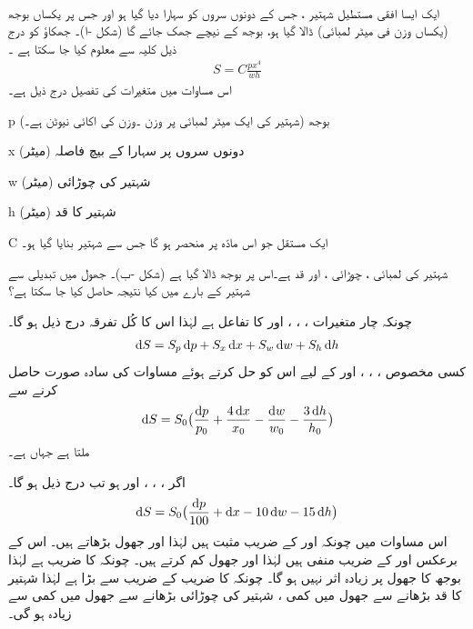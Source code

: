 \\
ایک ایسا  افقی مستطیل شہتیر ، جس کے  دونوں سروں کو  سہارا دیا گیا ہو   اور جس پر یکساں بوجھ (یکساں وزن فی میٹر لمبائی) ڈالا گیا ہو،   بوجھ کے نیچے جھک جائے گا (شکل -ا)۔ جھکاؤ   کو درج ذیل کلیہ سے معلوم کیا جا سکتا ہے ۔
\begin{align*}
S=C\frac{px^4}{wh}
\end{align*}
اس مساوات میں متغیرات کی تفصیل درج ذیل ہے۔
\begin{description}
\item{p}\quad
بوجھ (شہتیر کی  ایک میٹر  لمبائی پر وزن ۔وزن کی اکائی نیوٹن ہے۔)
\item{x}\quad
دونوں سروں پر سہارا کے بیچ فاصلہ (میٹر)
\item{w}\quad
شہتیر کی چوڑائی (میٹر)
\item{h}\quad
شہتیر کا قد (میٹر)
\item{C}\quad
ایک مستقل  جو اس مادّہ پر منحصر ہو گا جس سے شہتیر بنایا گیا ہو۔
\end{description}
 شہتیر کی   لمبائی ، چوڑائی  ،   اور   قد    ہے۔اس پر  بوجھ ڈالا گیا ہے (شکل -ب)۔ جھول میں تبدیلی    سے شہتیر کے بارے میں کیا نتیجہ حاصل کیا جا سکتا ہے؟

چونکہ  چار متغیرات ، ، ،  اور  کا تفاعل ہے لہٰذا اس  کا کُل تفرقہ  درج ذیل ہو گا۔
\begin{align*}
\dif S=S_p\dif p+S_x\dif x+S_w\dif w+S_h\dif h
\end{align*}
کسی مخصوص ، ، ، اور   کے لیے اس کو حل کرتے ہوئے  مساوات کی سادہ صورت حاصل کرنے سے  
\begin{align*}
\dif S=S_0\big(\frac{\dif p}{p_0}+\frac{4\dif x}{x_0}-\frac{\dif w}{w_0}-\frac{3\dif h}{h_0}\big)
\end{align*}
ملتا ہے جہاں  ہے۔

اگر ، ، ،  اور  ہو تب درج ذیل ہو گا۔
\begin{align}
\dif S=S_0\big(\frac{\dif p}{100}+\dif x-10\dif w-15\dif h\big)
\end{align}
اس مساوات میں چونکہ  اور  کے  ضریب   مثبت ہیں لہٰذا  اور  جھول بڑھاتے ہیں۔ اس کے برعکس  اور  کے  ضریب   منفی ہیں لہٰذا  اور  جھول کم کرتے ہیں۔ چونکہ  کا  ضریب   ہے لہٰذا بوجھ کا جھول پر زیادہ اثر نہیں ہو گا۔ چونکہ  کا  ضریب   کے  ضریب  سے بڑا ہے لہٰذا 
  شہتیر کا قد  بڑھانے سے جھول میں کمی  ، شہتیر  کی چوڑائی   بڑھانے  سے جھول میں کمی سے زیادہ ہو گی۔

